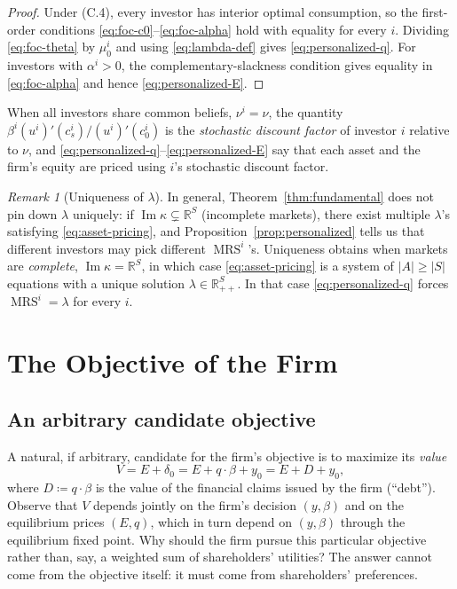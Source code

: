 \documentclass[11pt,a4paper,oneside]{book}
\def\R{\mathbb{R}}
\def\geq{\geqslant}
\DeclareMathOperator{\MRS}{MRS}
\DeclareMathOperator{\Range}{Im}
\theoremstyle{plain}
\theoremstyle{definition}
\theoremstyle{remark}
\newtheorem{remark}[theorem]{Remark}
\numberwithin{equation}{chapter}
\begin{document}
\begin{proof}
Under (C.4), every investor has interior optimal consumption, so the first-order conditions \eqref{eq:foc-c0}--\eqref{eq:foc-alpha} hold with equality for every $i$.
Dividing \eqref{eq:foc-theta} by $\mu^i_0$ and using \eqref{eq:lambda-def} gives \eqref{eq:personalized-q}.
For investors with $\alpha^i > 0$, the complementary-slackness condition gives equality in \eqref{eq:foc-alpha} and hence \eqref{eq:personalized-E}.
\end{proof}

When all investors share common beliefs, $\nu^i = \nu$, the quantity $\beta^i (u^i)'(c^i_s) / (u^i)'(c^i_0)$ is the \emph{stochastic discount factor} of investor $i$ relative to $\nu$, and \eqref{eq:personalized-q}--\eqref{eq:personalized-E} say that each asset and the firm's equity are priced using $i$'s stochastic discount factor.

\begin{remark}[Uniqueness of $\lambda$]\label{rem:unique-lambda}
In general, Theorem~\ref{thm:fundamental} does not pin down $\lambda$ uniquely: if $\Range \kappa \subsetneq \R^S$ (incomplete markets), there exist multiple $\lambda$'s satisfying \eqref{eq:asset-pricing}, and Proposition~\ref{prop:personalized} tells us that different investors may pick different $\MRS^i$'s.
Uniqueness obtains when markets are \emph{complete}, $\Range \kappa = \R^S$, in which case \eqref{eq:asset-pricing} is a system of $|A| \geq |S|$ equations with a unique solution $\lambda \in \R^S_{++}$.
In that case \eqref{eq:personalized-q} forces $\MRS^i = \lambda$ for every $i$.
\end{remark}

\section{The Objective of the Firm}
\label{sec:objective}

\subsection{An arbitrary candidate objective}

A natural, if arbitrary, candidate for the firm's objective is to maximize its \emph{value}
\begin{equation}\label{eq:firm-value}
  V = E + \delta_0 = E + q \cdot \beta + y_0 = E + D + y_0,
\end{equation}
where $D \coloneqq q \cdot \beta$ is the value of the financial claims issued by the firm (``debt'').
Observe that $V$ depends jointly on the firm's decision $(y, \beta)$ and on the equilibrium prices $(E, q)$, which in turn depend on $(y, \beta)$ through the equilibrium fixed point.
Why should the firm pursue this particular objective rather than, say, a weighted sum of shareholders' utilities?
The answer cannot come from the objective itself: it must come from shareholders' preferences.
\end{document}
